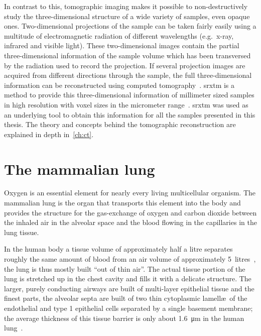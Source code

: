 In contrast to this, tomographic imaging makes it possible to non-de\-struc\-tive\-ly study the three-dimensional structure of a wide variety of samples, even opaque ones. Two-dimensional projections of the sample can be taken fairly easily using a multitude of electromagnetic radiation of different wavelengths (e.g.\ x-ray, infrared and visible light). These two-dimensional images contain the partial three-dimensional information of the sample volume which has been transversed by the radiation used to record the projection. If several projection images are acquired from different directions through the sample, the full three-dimensional information can be reconstructed using computed tomography~\cite{Hounsfield1976a}. \acf{srxtm} is a method to provide this three-dimensional information of millimeter sized samples in high resolution with voxel sizes in the micrometer range~\cite{Bonse2008}. \ac{srxtm} was used as an underlying tool to obtain this information for all the samples presented in this thesis. The theory and concepts behind the tomographic reconstruction are explained in depth in~\autoref{ch:ct}.

\section{The mammalian lung}
Oxygen is an essential element for nearly every living multicellular organism. The mammalian lung is the organ that transports this element into the body and provides the structure for the gas-exchange of oxygen and carbon dioxide between the inhaled air in the alveolar space and the blood flowing in the capillaries in the lung tissue.

In the human body a tissue volume of approximately half a litre separates roughly the same amount of blood from an air volume of approximately 5~litres~\cite{Weibel2009}, the lung is thus mostly built ``out of thin air''. The actual tissue portion of the lung is stretched up in the chest cavity and fills it with a delicate structure. The larger, purely conducting airways are built of multi-layer epithelial tissue and the finest parts, the alveolar septa are built of two thin cytoplasmic lamell\ae\ of the endothelial and type 1 epithelial cells separated by a single basement membrane; the average thickness of this tissue barrier is only about \SI{1.6}{\micro\meter} in the human lung~\cite{Weibel2009}.

